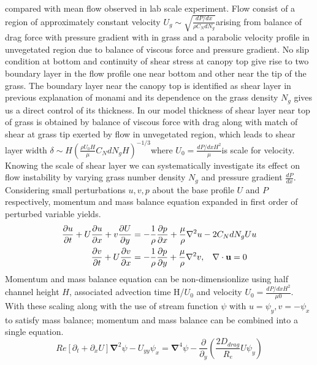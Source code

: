 \documentclass[aps,twocolumn,floatfix,prl,10pt]{revtex4-1}
\newcommand{\bu}{\mathbf{u}}
\newcommand{\grad}{\mathbf{\nabla}}
\newcommand{\del}{\partial}
\begin{document}
compared with mean flow observed in lab scale experiment. Flow consist of a region of approximately constant velocity
\small$U_g \sim \sqrt{\frac{dP/dx}{\rho C_N dN_g}}$\normalsize arising from balance of drag force with pressure gradient with in grass and a parabolic velocity 
profile in unvegetated region due to balance of viscous force and pressure gradient. No slip condition at bottom and continuity of shear stress at canopy top 
give rise to two boundary layer in the flow profile one near bottom and other near the tip of the grass. The boundary layer near the canopy top is identified 
as shear layer in previous explanation of monami and its dependence on the grass density $N_g$ gives us a direct control of its thickness. 
In our model thickness of shear layer near top of grass is obtained by balance of viscous force 
with drag along with match of shear at grass tip exerted by flow in unvegetated region, which leads to shear layer 
width \small $\delta \sim  H\left(\frac{\rho U_0 H}{\mu} C_N d N_g H\right)^{-1/3}$\normalsize where \small$U_0 = \frac{dP/dxH^2}{\mu}$\normalsize is scale for velocity.
\newline
Knowing the scale of shear layer we can systematically investigate its effect on flow instability
by varying grass number density $N_g$ and pressure gradient $\frac{dP}{dx}$. Considering small perturbations $u, v, p$ about the base profile $U$ and $P$
respectively, momentum and mass balance equation expanded in first order of perturbed variable yields.
\small
\begin{equation}
\begin{split}
\frac{\del u}{\del t}+U\frac{\del u}{\del x}+v\frac{\del U}{\del y} &= -\frac{1}{\rho}\frac{\del p}{\del x}+\frac{\mu}{\rho}\nabla^2u-2C_{N}dN_{g}Uu\\
\frac{\del v}{\del  t}+ U\frac{\del v}{\del x} &= -\frac{1}{\rho}\frac{\del p}{\del y}+\frac{\mu}{\rho}\nabla^2v, \hspace{0.3cm} \nabla\cdot\bu=0\\
\end{split}
\end{equation}
\normalsize
Momentum and mass balance equation can be non-dimensionlize using half channel height $H$, associated advection time H/$U_0$ and velocity $U_0 = \frac{dP/dxH^2}{\mu0}$.
With these scaling along with the use of stream function $\psi$ with $u = \psi_{y}, v= -\psi_x$ to satisfy mass balance; momentum and mass balance can be combined 
into a single equation.
\begin{equation}
\scriptstyle{
Re\left[\del_t+\del_x U \right]\grad^2\psi - U_{yy}\psi_x = \grad^4\psi-\frac{\del}{\del_y}\left(\frac{2D_{drag}}{R_e}U\psi_y\right)
}
\end{equation}
\end{document}
